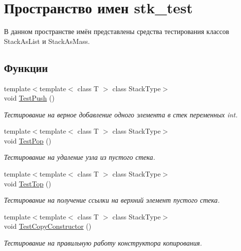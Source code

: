 \hypertarget{namespacestk__test}{}\section{Пространство имен stk\+\_\+test}
\label{namespacestk__test}


В данном пространстве имён представлены средства тестирования классов Stack\+As\+List и Stack\+As\+Mass.  


\subsection*{Функции}
\begin{DoxyCompactItemize}
\item 
{\footnotesize template$<$template$<$ class T $>$ class Stack\+Type$>$ }\\void \hyperlink{namespacestk__test_a2d62ae6019345309a38d3a15ff28cc5d}{Test\+Push} ()
\begin{DoxyCompactList}\small\item\em Тестирование на верное добавление одного элемента в стек переменных int. \end{DoxyCompactList}\item 
{\footnotesize template$<$template$<$ class T $>$ class Stack\+Type$>$ }\\void \hyperlink{namespacestk__test_a359fc261443d7bdcd4d9bfa43ce9dc7d}{Test\+Pop} ()
\begin{DoxyCompactList}\small\item\em Тестирование на удаление узла из пустого стека. \end{DoxyCompactList}\item 
{\footnotesize template$<$template$<$ class T $>$ class Stack\+Type$>$ }\\void \hyperlink{namespacestk__test_aadcc1a403c31c6f26df731492b32bb5e}{Test\+Top} ()
\begin{DoxyCompactList}\small\item\em Тестирование на получение ссылки на верхний элемент пустого стека. \end{DoxyCompactList}\item 
{\footnotesize template$<$template$<$ class T $>$ class Stack\+Type$>$ }\\void \hyperlink{namespacestk__test_aa0039c601a4cf946ebfaad9ef3af4e7f}{Test\+Copy\+Constructor} ()
\begin{DoxyCompactList}\small\item\em Тестирование на правильную работу конструктора копирования. \end{DoxyCompactList}\item 

\end{DoxyCompactItemize}
